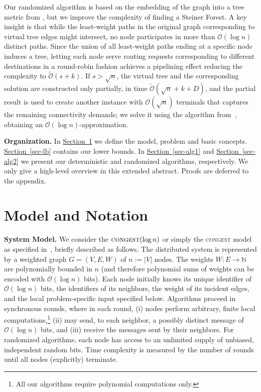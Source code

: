 \documentclass[letterpaper,11pt]{article}
\newcommand{\namedref}[2]{\hyperref[#2]{#1~\ref*{#2}}}
\newcommand{\sectionref}[1]{\namedref{Section}{#1}}
\newcommand{\N}{\mathbb{N}}
\newcommand{\BO}{\mathcal{O}}
\newcommand{\sO}{\tilde{\mathcal{O}}}
\newcommand{\Congest}{\textsc{congest}\xspace}
\renewcommand{\paragraph}[1]{\smallskip\par\noindent\textbf{#1}}
\begin{document}
Our randomized algorithm is based on the embedding of the graph into a tree
metric from \cite{KKMPT-12}, but we improve the complexity of finding a Steiner
Forest. A key insight is that while the least-weight paths in the original
graph corresponding to virtual tree edges might intersect, no node participates
in more than $\BO(\log n)$ distinct paths. Since the union of
all least-weight paths ending at a specific node induces a tree, letting each
node serve routing requests corresponding to different destinations in a
round-robin fashion achieves a pipelining effect reducing the complexity to
$\sO(s+k)$.  If $s>\sqrt{n}$, the virtual tree and the corresponding
solution are constructed only partially, in time $\sO(\sqrt{n}+k+D)$,
and the partial result is used to create another instance with
$\BO(\sqrt n)$ terminals that captures the remaining connectivity demands; we solve it using
the algorithm from~\cite{LenzenP13}, obtaining an $\BO(\log n)$-approximation.






\paragraph{Organization.}
In \sectionref{sec:model} we define the model, problem and basic
concepts.  \sectionref{sec-lb} contains our lower bounds.  
In \sectionref{sec-alg1} and \sectionref{sec-alg2} we  present our
deterministic and randomized algorithms, respectively. We only give a high-level overview in this extended abstract. Proofs
are deferred to the appendix.

\section{Model and Notation}
\label{sec:model}
\paragraph{System Model.}
We consider the $\Congest(\log n)$ or simply the \Congest model as
specified in~\cite{Peleg:book}, briefly described as follows. The
distributed system is represented 
by a weighted graph $G=(V,E,W)$ of $n:=|V|$ nodes. The weights $W:E\to
\N$ are polynomially bounded in $n$ (and therefore polynomial sums of
weights can be encoded with $\BO(\log n)$ bits). Each node initially
knows its unique identifier of $\BO(\log n)$ bits, the identifiers of
its neighbors, the weight of its incident edges, and the local
problem-specific input specified below. Algorithms proceed in
synchronous rounds, where in each round, (i) nodes perform arbitrary,
finite local computations,\footnote{All our algorithms require polynomial computations only.} (ii) may
send, to each neighbor, a possibly distinct message of $\BO(\log n)$ bits, and
(iii) receive the messages sent by their neighbors. For randomized algorithms,
each node has access to an unlimited supply of unbiased, independent random
bits. Time complexity is measured by the number of rounds until all nodes
(explicitly) terminate. 
\end{document}
